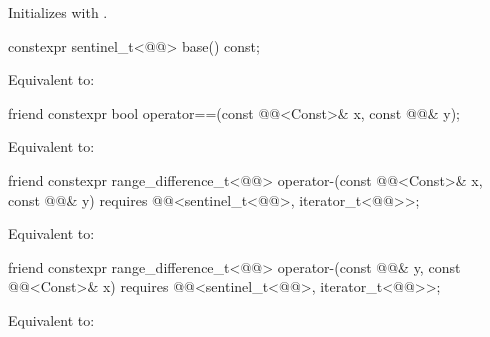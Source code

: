 \begin{itemdescr}
\pnum
\effects
Initializes  with .
\end{itemdescr}

\begin{itemdecl}
constexpr sentinel_t<@@> base() const;
\end{itemdecl}

\begin{itemdescr}
\pnum
\effects
Equivalent to: 
\end{itemdescr}

\begin{itemdecl}
friend constexpr bool operator==(const @@<Const>& x, const @@& y);
\end{itemdecl}

\begin{itemdescr}
\pnum
\effects
Equivalent to: 
\end{itemdescr}

%
\begin{itemdecl}
friend constexpr range_difference_t<@@>
  operator-(const @@<Const>& x, const @@& y)
    requires @@<sentinel_t<@@>, iterator_t<@@>>;
\end{itemdecl}

\begin{itemdescr}
\pnum
\effects
Equivalent to: 
\end{itemdescr}

%
\begin{itemdecl}
friend constexpr range_difference_t<@@>
  operator-(const @@& y, const @@<Const>& x)
    requires @@<sentinel_t<@@>, iterator_t<@@>>;
\end{itemdecl}

\begin{itemdescr}
\pnum
\effects
Equivalent to: 
\end{itemdescr}

